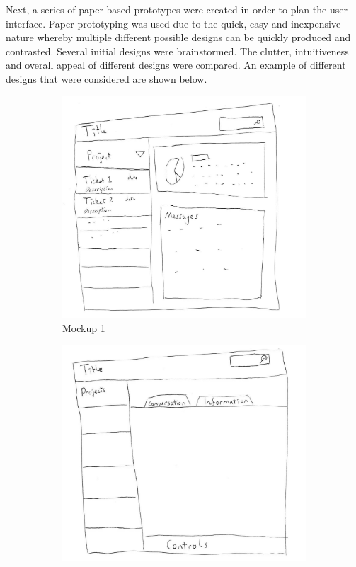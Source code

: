 \documentclass[a4paper]{l3proj}
\begin{document}
Next, a series of paper based prototypes were created in order to plan the user interface. Paper prototyping was used due to the quick, easy and inexpensive nature whereby multiple different possible designs can be quickly produced and contrasted. Several initial designs were brainstormed. The clutter, intuitiveness and overall appeal of different designs were compared.  An example of different designs that were considered are shown below. \par

\begin{figure}[ht]
    \centering
    \begin{subfigure}[b]{0.3\textwidth}
	    \centering
		\includegraphics[width=\textwidth]{mockup1}
		\caption{Mockup 1}
		\label{fig:mockup1}        
    \end{subfigure}
    \hfill
    \begin{subfigure}[b]{0.3\textwidth}
        \centering
		\includegraphics[width=\textwidth]{mockup2}

\end{subfigure}
\end{figure}
\end{document}
